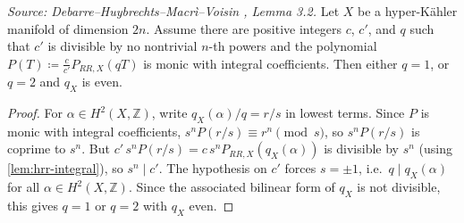 \begin{lemma}
  \label{lem:polynomial-parity}
  \textit{Source: Debarre--Huybrechts--Macr\`i--Voisin \cite{MR4654610}, Lemma 3.2.}
  Let \(X\) be a hyper-K\"ahler manifold of dimension \(2n\).  Assume there are positive
  integers \(c\), \(c'\), and \(q\) such that \(c'\) is divisible by no nontrivial
  \(n\)-th powers and the polynomial \(P(T) \coloneqq \tfrac{c}{c'} P_{RR,X}(qT)\) is
  monic with integral coefficients.  Then either \(q = 1\), or \(q = 2\) and \(q_X\) is
  even.
\end{lemma}

\begin{proof}
  For \(\alpha \in H^2(X, \mathbb{Z})\), write \(q_X(\alpha)/q = r/s\) in lowest terms.
  Since \(P\) is monic with integral coefficients, \(s^n P(r/s) \equiv r^n \pmod{s}\),
  so \(s^n P(r/s)\) is coprime to \(s^n\).  But
  \(c'\, s^n P(r/s) = c\, s^n P_{RR,X}(q_X(\alpha))\) is divisible by \(s^n\) (using
  \cref{lem:hrr-integral}), so \(s^n \mid c'\).  The hypothesis on \(c'\) forces
  \(s = \pm 1\), i.e.\ \(q \mid q_X(\alpha)\) for all \(\alpha \in H^2(X, \mathbb{Z})\).
  Since the associated bilinear form of \(q_X\) is not divisible, this gives \(q = 1\)
  or \(q = 2\) with \(q_X\) even.
\end{proof}

